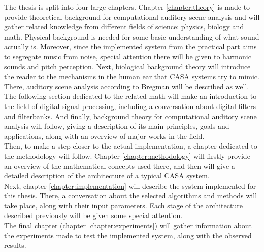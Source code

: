 The thesis is split into four large chapters. Chapter \ref{chapter:theory} is made to provide theoretical background for computational auditory scene analysis and will gather related knowledge from different fields of science: physics, biology and math. Physical background is needed for some basic understanding of what sound actually is. Moreover, since the implemented system from the practical part aims to segregate music from noise, special attention there will be given to harmonic sounds and pitch perception. Next, biological background theory will introduce the reader to the mechanisms in the human ear that CASA systems try to mimic. There, auditory scene analysis according to Bregman will be described as well. The following section dedicated to the related math will make an introduction to the field of digital signal processing, including a conversation about digital filters and filterbanks. And finally, background theory for computational auditory scene analysis will follow, giving a description of its main principles, goals and applications, along with an overview of major works in the field.\\

Then, to make a step closer to the actual implementation, a chapter dedicated to the metho\-dology will follow. Chapter \ref{chapter:methodology} will firstly provide an overview of the mathematical concepts used there, and then will give a detailed description of the architecture of a typical CASA system.\\

Next, chapter \ref{chapter:implementation} will describe the system implemented for this thesis. There, a conversation about the selected algorithms and methods will take place, along with their input parameters. Each stage of the architecture described previously will be given some special attention.\\

The final chapter (chapter \ref{chapter:experiments}) will gather information about the experiments made to test the implemented system, along with the observed results.\\
